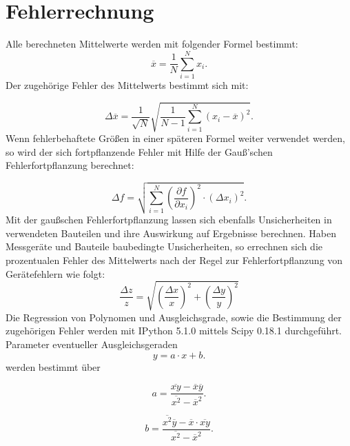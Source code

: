 \section{Fehlerrechnung}
\label{sec:fehlerrechnung}
Alle berechneten Mittelwerte werden mit folgender Formel bestimmt:
\begin{equation}
  \label{eqn:mittelwert}
  \overline x=\frac{1}{N}\sum \limits_{i=1}^{N} x_i .
\end{equation}
Der zugehörige Fehler des Mittelwerts bestimmt sich mit:

\begin{equation}
  \label{eqn:mittelwertfehler}
  \Delta \overline x= \frac{1}{\sqrt{N}} \sqrt{\frac{1}{N-1} \sum \limits_{i=1}^{N} (x_i- \overline x)^2}.
\end {equation}
Wenn fehlerbehaftete Größen in einer späteren Formel weiter verwendet werden, so wird der sich fortpflanzende Fehler
mit Hilfe der Gauß’schen Fehlerfortpflanzung berechnet:

\begin{equation}
  \label{eqn:fehlerfortpflanzung}
  \Delta f = \sqrt{ \sum \limits_{i = 1}^{N} (\frac{\partial f}{\partial x_i})^2 \cdot (\Delta x_i)^2}.
\end{equation}
Mit der gaußschen Fehlerfortpflanzung lassen sich ebenfalls Unsicherheiten in verwendeten Bauteilen und ihre Auswirkung auf Ergebnisse berechnen.
Haben Messgeräte und Bauteile baubedingte Unsicherheiten, so errechnen sich die prozentualen Fehler des Mittelwerts nach der Regel zur Fehlerfortpflanzung von Gerätefehlern wie folgt:
 \begin{equation}
   \frac{\Delta z}{z}=\sqrt{(\frac{\Delta x}{x})^2+(\frac{\Delta y}{y})^2}
\end{equation}
Die Regression von Polynomen und Ausgleichsgrade, sowie die Bestimmung der zugehörigen Fehler werden mit
IPython 5.1.0 mittels Scipy 0.18.1 \cite{scipy} durchgeführt.
Parameter eventueller Ausgleichsgeraden
\begin{equation}
\label{eqn:ausgleichsgrade}
y=a \cdot x +b .
\end{equation}
werden bestimmt über

\begin{equation}
\label{eqn:ausgleichsgrade_a}
a= \frac{ \overline{xy}- \overline{x} \overline{y}}{\overline{x^2}-\overline{x}^2} .
\end{equation}

\begin{equation}
\label{eqn:ausgleichsgrade_b}
b= \frac{ \overline{x^2} \overline{y}- \overline{x} \cdot \overline{xy}}{\overline{x^2}-\overline{x}^2} .
\end{equation}
